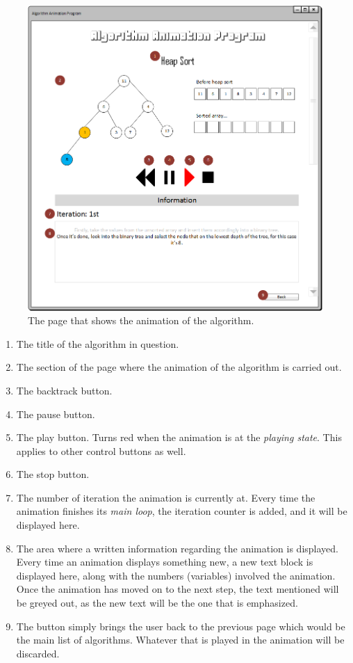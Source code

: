 \begin{figure}[H]
\centering
\hspace*{-0.5cm}
\includegraphics[scale=0.8]{images/report_images/uiAnimation.png}
\caption{The page that shows the animation of the algorithm.}
\label{uiAnimation}
\end{figure}

\begin{enumerate}
\item The title of the algorithm in question.
\item The section of the page where the animation of the algorithm is carried out.
\item The backtrack button.
\item The pause button.
\item The play button. Turns red when the animation is at the \textit{playing state}. This applies to other control buttons as well.
\item The stop button.
\item The number of iteration the animation is currently at. Every time the animation finishes its \textit{main loop}, the iteration counter is added, and it will be displayed here.
\item The area where a written information regarding the animation is displayed. Every time an animation displays something new, a new text block is displayed here, along with the numbers (variables) involved the animation. Once the animation has moved on to the next step, the text mentioned will be greyed out, as the new text will be the one that is emphasized. 
\item The button simply brings the user back to the previous page which would be the main list of algorithms. Whatever that is played in the animation will be discarded.
\end{enumerate}

